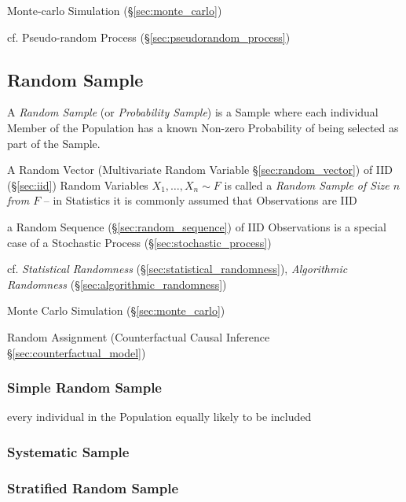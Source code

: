 Monte-carlo Simulation (\S\ref{sec:monte_carlo})

cf. Pseudo-random Process (\S\ref{sec:pseudorandom_process})



\subsection{Random Sample}\label{sec:random_sample}

A \emph{Random Sample} (or \emph{Probability Sample}) is a Sample where each
individual Member of the Population has a known Non-zero Probability of being
selected as part of the Sample.

A Random Vector (Multivariate Random Variable \S\ref{sec:random_vector}) of IID
(\S\ref{sec:iid}) Random Variables $X_1, \ldots, X_n \sim F$ is called a
\emph{Random Sample of Size $n$ from $F$} -- in Statistics it is commonly
assumed that Observations are IID

 a Random Sequence (\S\ref{sec:random_sequence}) of IID Observations is a
 special case of a Stochastic Process (\S\ref{sec:stochastic_process})

\fist cf. \emph{Statistical Randomness} (\S\ref{sec:statistical_randomness}),
\emph{Algorithmic Randomness} (\S\ref{sec:algorithmic_randomness})

\fist Monte Carlo Simulation (\S\ref{sec:monte_carlo})

\fist Random Assignment (Counterfactual Causal Inference
\S\ref{sec:counterfactual_model})



\subsubsection{Simple Random Sample}\label{sec:simple_random_sample}

every individual in the Population equally likely to be included



\subsubsection{Systematic Sample}\label{sec:systematic_sample}

\subsubsection{Stratified Random Sample}\label{sec:stratified_random_sample}

